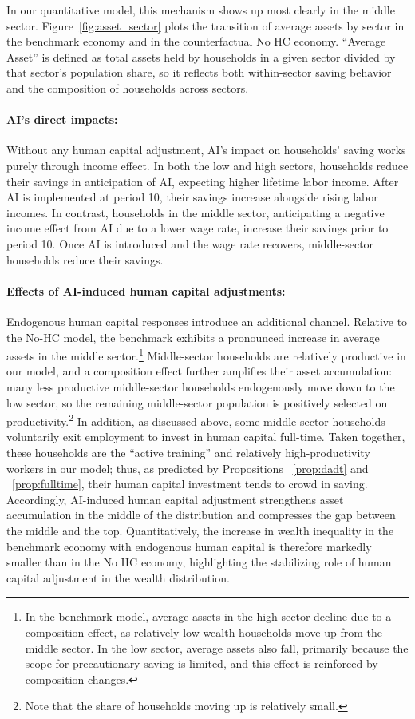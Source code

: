 \documentclass[12pt]{article}
\begin{document}
In our quantitative model, this mechanism shows up most clearly in the middle sector. Figure~\ref{fig:asset_sector} plots the transition of average assets by sector in the benchmark economy and in the counterfactual No HC economy. “Average Asset” is defined as total assets held by households in a given sector divided by that sector’s population share, so it reflects both within-sector saving behavior and the composition of households across sectors.
\paragraph{AI's direct impacts:} Without any human capital adjustment, AI's impact on households' saving works purely through income effect. In both the low and high sectors, households reduce their savings in anticipation of AI, expecting higher lifetime labor income. After AI is implemented at period 10, their savings increase alongside rising labor incomes. In contrast, households in the middle sector, anticipating a negative income effect from AI due to a lower wage rate, increase their savings prior to period 10. Once AI is introduced and the wage rate recovers, middle-sector households reduce their savings.

\paragraph{Effects of AI-induced human capital adjustments:}
Endogenous human capital responses introduce an additional channel. Relative to the No-HC model, the benchmark exhibits a pronounced increase in average assets in the middle sector.\footnote{In the benchmark model, average assets in the high sector decline due to a composition effect, as relatively low-wealth households move up from the middle sector. In the low sector, average assets also fall, primarily because the scope for precautionary saving is limited, and this effect is reinforced by composition changes.} Middle-sector households are relatively productive in our model, and a composition effect further amplifies their asset accumulation: many less productive middle-sector households endogenously move down to the low sector, so the remaining middle-sector population is positively selected on productivity.\footnote{Note that the share of households moving up is relatively small.} In addition, as discussed above, some middle-sector households voluntarily exit employment to invest in human capital full-time. Taken together, these households are  the “active training” and relatively high-productivity workers in our model; thus, as predicted by Propositions ~\ref{prop:dadt} and ~\ref{prop:fulltime}, their human capital investment tends to crowd in saving. Accordingly, AI-induced human capital adjustment strengthens asset accumulation in the middle of the distribution and compresses the gap between the middle and the top. Quantitatively, the increase in wealth inequality in the benchmark economy with endogenous human capital is therefore markedly smaller than in the No HC economy, highlighting the stabilizing role of human capital adjustment in the wealth distribution.
\end{document}
